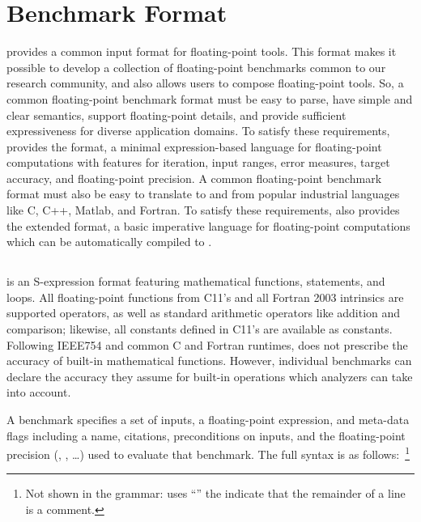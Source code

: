 \documentclass[main.tex]{subfiles}
\begin{document}
\section{Benchmark Format}
\label{sec:format}

\name provides a common input format for floating-point tools.
This format makes it possible to develop
  a collection of floating-point benchmarks
  common to our research community,
  and also allows users to compose floating-point tools.
So, a common floating-point benchmark format must be
  easy to parse,
  have simple and clear semantics,
  support floating-point details, and
  provide sufficient expressiveness for diverse application domains.
To satisfy these requirements,
  \name provides the \core format,
  a minimal expression-based language
  for floating-point computations
  with features for iteration, input ranges,
  error measures, target accuracy, and floating-point
  precision.
A common floating-point benchmark format
  must also be easy to translate to and from
  popular industrial languages like C, C++, Matlab, and Fortran.
To satisfy these requirements,
  \name also provides the extended \surface format,
  a basic imperative language for floating-point computations
  which can be automatically compiled to \core.

\subsection{\core}

\core is an S-expression format featuring
  mathematical functions,  statements, and  loops.
All floating-point functions
  from C11's  and all Fortran 2003 intrinsics
  are supported operators,
  as well as standard arithmetic operators like addition and comparison;
  likewise, all constants defined in C11's  are available as constants.
Following IEEE754 and common C and Fortran runtimes,
  \core does not prescribe the accuracy of built-in
  mathematical functions.
However, individual benchmarks can declare the accuracy
  they assume for built-in operations which
  analyzers can take into account.


A \core benchmark specifies a set of inputs,
  a floating-point expression,
  and meta-data flags including
  a name, citations, preconditions on inputs,
  and the floating-point precision
  (, , \ldots)
  used to evaluate that benchmark.
The full \core syntax is as follows:~\footnote{
Not shown in the grammar:
  \name uses ``\C{;}'' the indicate that
  the remainder of a line is a comment.}
\end{document}
